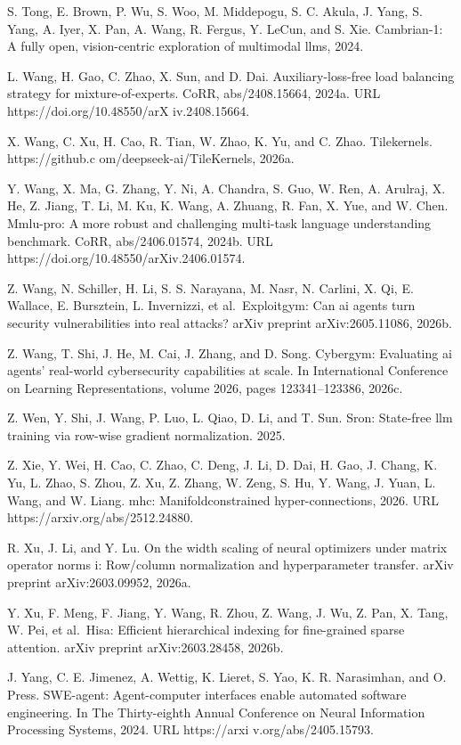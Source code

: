 \documentclass[
  10
]{article}
\begin{document}
S. Tong, E. Brown, P. Wu, S. Woo, M. Middepogu, S. C. Akula, J. Yang, S.
Yang, A. Iyer, X. Pan, A. Wang, R. Fergus, Y. LeCun, and S. Xie.
Cambrian-1: A fully open, vision-centric exploration of multimodal llms,
2024.

L. Wang, H. Gao, C. Zhao, X. Sun, and D. Dai. Auxiliary-loss-free load
balancing strategy for mixture-of-experts. CoRR, abs/2408.15664, 2024a.
URL https://doi.org/10.48550/arX iv.2408.15664.

X. Wang, C. Xu, H. Cao, R. Tian, W. Zhao, K. Yu, and C. Zhao.
Tilekernels. https://github.c om/deepseek-ai/TileKernels, 2026a.

Y. Wang, X. Ma, G. Zhang, Y. Ni, A. Chandra, S. Guo, W. Ren, A. Arulraj,
X. He, Z. Jiang, T. Li, M. Ku, K. Wang, A. Zhuang, R. Fan, X. Yue, and
W. Chen. Mmlu-pro: A more robust and challenging multi-task language
understanding benchmark. CoRR, abs/2406.01574, 2024b. URL
https://doi.org/10.48550/arXiv.2406.01574.

Z. Wang, N. Schiller, H. Li, S. S. Narayana, M. Nasr, N. Carlini, X. Qi,
E. Wallace, E. Bursztein, L. Invernizzi, et al.~Exploitgym: Can ai
agents turn security vulnerabilities into real attacks? arXiv preprint
arXiv:2605.11086, 2026b.

Z. Wang, T. Shi, J. He, M. Cai, J. Zhang, and D. Song. Cybergym:
Evaluating ai agents' real-world cybersecurity capabilities at scale. In
International Conference on Learning Representations, volume 2026, pages
123341--123386, 2026c.

Z. Wen, Y. Shi, J. Wang, P. Luo, L. Qiao, D. Li, and T. Sun. Sron:
State-free llm training via row-wise gradient normalization. 2025.

Z. Xie, Y. Wei, H. Cao, C. Zhao, C. Deng, J. Li, D. Dai, H. Gao, J.
Chang, K. Yu, L. Zhao, S. Zhou, Z. Xu, Z. Zhang, W. Zeng, S. Hu, Y.
Wang, J. Yuan, L. Wang, and W. Liang. mhc: Manifoldconstrained
hyper-connections, 2026. URL https://arxiv.org/abs/2512.24880.

R. Xu, J. Li, and Y. Lu. On the width scaling of neural optimizers under
matrix operator norms i: Row/column normalization and hyperparameter
transfer. arXiv preprint arXiv:2603.09952, 2026a.



Y. Xu, F. Meng, F. Jiang, Y. Wang, R. Zhou, Z. Wang, J. Wu, Z. Pan, X.
Tang, W. Pei, et al.~Hisa: Efficient hierarchical indexing for
fine-grained sparse attention. arXiv preprint arXiv:2603.28458, 2026b.

J. Yang, C. E. Jimenez, A. Wettig, K. Lieret, S. Yao, K. R. Narasimhan,
and O. Press. SWE-agent: Agent-computer interfaces enable automated
software engineering. In The Thirty-eighth Annual Conference on Neural
Information Processing Systems, 2024. URL https://arxi
v.org/abs/2405.15793.
\end{document}
